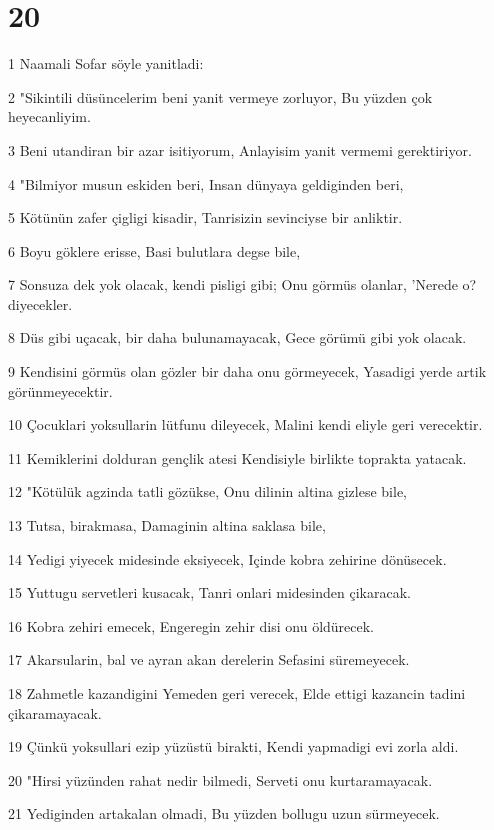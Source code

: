 \chapter{20}

\par 1 Naamali Sofar söyle yanitladi:
\par 2 "Sikintili düsüncelerim beni yanit vermeye zorluyor, Bu yüzden çok heyecanliyim.
\par 3 Beni utandiran bir azar isitiyorum, Anlayisim yanit vermemi gerektiriyor.
\par 4 "Bilmiyor musun eskiden beri, Insan dünyaya geldiginden beri,
\par 5 Kötünün zafer çigligi kisadir, Tanrisizin sevinciyse bir anliktir.
\par 6 Boyu göklere erisse, Basi bulutlara degse bile,
\par 7 Sonsuza dek yok olacak, kendi pisligi gibi; Onu görmüs olanlar, 'Nerede o? diyecekler.
\par 8 Düs gibi uçacak, bir daha bulunamayacak, Gece görümü gibi yok olacak.
\par 9 Kendisini görmüs olan gözler bir daha onu görmeyecek, Yasadigi yerde artik görünmeyecektir.
\par 10 Çocuklari yoksullarin lütfunu dileyecek, Malini kendi eliyle geri verecektir.
\par 11 Kemiklerini dolduran gençlik atesi Kendisiyle birlikte toprakta yatacak.
\par 12 "Kötülük agzinda tatli gözükse, Onu dilinin altina gizlese bile,
\par 13 Tutsa, birakmasa, Damaginin altina saklasa bile,
\par 14 Yedigi yiyecek midesinde eksiyecek, Içinde kobra zehirine dönüsecek.
\par 15 Yuttugu servetleri kusacak, Tanri onlari midesinden çikaracak.
\par 16 Kobra zehiri emecek, Engeregin zehir disi onu öldürecek.
\par 17 Akarsularin, bal ve ayran akan derelerin Sefasini süremeyecek.
\par 18 Zahmetle kazandigini Yemeden geri verecek, Elde ettigi kazancin tadini çikaramayacak.
\par 19 Çünkü yoksullari ezip yüzüstü birakti, Kendi yapmadigi evi zorla aldi.
\par 20 "Hirsi yüzünden rahat nedir bilmedi, Serveti onu kurtaramayacak.
\par 21 Yediginden artakalan olmadi, Bu yüzden bollugu uzun sürmeyecek.
